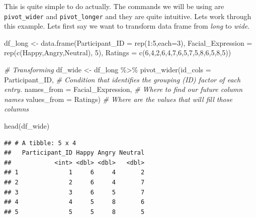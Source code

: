 \documentclass[
]{book}
\newenvironment{Shaded}{\begin{snugshade}}{\end{snugshade}}
\newcommand{\AttributeTok}[1]{\textcolor[rgb]{0.77,0.63,0.00}{#1}}
\newcommand{\CommentTok}[1]{\textcolor[rgb]{0.56,0.35,0.01}{\textit{#1}}}
\newcommand{\DecValTok}[1]{\textcolor[rgb]{0.00,0.00,0.81}{#1}}
\newcommand{\FunctionTok}[1]{\textcolor[rgb]{0.00,0.00,0.00}{#1}}
\newcommand{\NormalTok}[1]{#1}
\newcommand{\OtherTok}[1]{\textcolor[rgb]{0.56,0.35,0.01}{#1}}
\newcommand{\SpecialCharTok}[1]{\textcolor[rgb]{0.00,0.00,0.00}{#1}}
\newcommand{\StringTok}[1]{\textcolor[rgb]{0.31,0.60,0.02}{#1}}
\begin{document}
This is quite simple to do actually.
The commands we will be using are \texttt{pivot\_wider} and \texttt{pivot\_longer} and they are quite intuitive.
Lets work through this example.
Lets first say we want to transform data frame from \emph{long} to \emph{wide}.

\begin{Shaded}
\begin{Highlighting}[]
\NormalTok{df\_long }\OtherTok{\textless{}{-}} \FunctionTok{data.frame}\NormalTok{(}\AttributeTok{Participant\_ID =} \FunctionTok{rep}\NormalTok{(}\DecValTok{1}\SpecialCharTok{:}\DecValTok{5}\NormalTok{,}\AttributeTok{each=}\DecValTok{3}\NormalTok{),}
                      \AttributeTok{Facial\_Expression =} \FunctionTok{rep}\NormalTok{(}\FunctionTok{c}\NormalTok{(}\StringTok{\textquotesingle{}Happy\textquotesingle{}}\NormalTok{,}\StringTok{\textquotesingle{}Angry\textquotesingle{}}\NormalTok{,}\StringTok{\textquotesingle{}Neutral\textquotesingle{}}\NormalTok{), }\DecValTok{5}\NormalTok{),}
                      \AttributeTok{Ratings =} \FunctionTok{c}\NormalTok{(}\DecValTok{6}\NormalTok{,}\DecValTok{4}\NormalTok{,}\DecValTok{2}\NormalTok{,}\DecValTok{6}\NormalTok{,}\DecValTok{4}\NormalTok{,}\DecValTok{7}\NormalTok{,}\DecValTok{6}\NormalTok{,}\DecValTok{5}\NormalTok{,}\DecValTok{7}\NormalTok{,}\DecValTok{5}\NormalTok{,}\DecValTok{8}\NormalTok{,}\DecValTok{6}\NormalTok{,}\DecValTok{5}\NormalTok{,}\DecValTok{8}\NormalTok{,}\DecValTok{5}\NormalTok{))}

\CommentTok{\# Transforming}
\NormalTok{df\_wide }\OtherTok{\textless{}{-}}\NormalTok{ df\_long }\SpecialCharTok{\%\textgreater{}\%} 
  \FunctionTok{pivot\_wider}\NormalTok{(}\AttributeTok{id\_cols =}\NormalTok{ Participant\_ID,  }\CommentTok{\# Condition that identifies the grouping (ID) factor of each entry.}
              \AttributeTok{names\_from =}\NormalTok{ Facial\_Expression,  }\CommentTok{\# Where to find our future column names}
              \AttributeTok{values\_from =}\NormalTok{ Ratings)   }\CommentTok{\# Where are the values that will fill those columns }


\FunctionTok{head}\NormalTok{(df\_wide)}
\end{Highlighting}
\end{Shaded}

\begin{verbatim}
## # A tibble: 5 x 4
##   Participant_ID Happy Angry Neutral
##            <int> <dbl> <dbl>   <dbl>
## 1              1     6     4       2
## 2              2     6     4       7
## 3              3     6     5       7
## 4              4     5     8       6
## 5              5     5     8       5
\end{verbatim}
\end{document}

